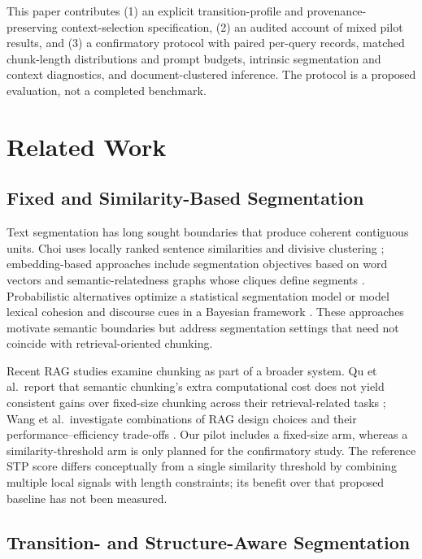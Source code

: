 \documentclass[10pt]{article}
\begin{document}
This paper contributes (1) an explicit transition-profile and provenance-preserving context-selection specification, (2) an audited account of mixed pilot results, and (3) a confirmatory protocol with paired per-query records, matched chunk-length distributions and prompt budgets, intrinsic segmentation and context diagnostics, and document-clustered inference. The protocol is a proposed evaluation, not a completed benchmark.

\section{Related Work}

\subsection{Fixed and Similarity-Based Segmentation}

Text segmentation has long sought boundaries that produce coherent contiguous units. Choi uses locally ranked sentence similarities and divisive clustering \cite{Choi2000AdvancesDomain}; embedding-based approaches include segmentation objectives based on word vectors \cite{Alemi2015TextSegmentation} and semantic-relatedness graphs whose cliques define segments \cite{Glavas2016UnsupervisedText}. Probabilistic alternatives optimize a statistical segmentation model \cite{Utiyama2001StatisticalModel} or model lexical cohesion and discourse cues in a Bayesian framework \cite{Eisenstein2008BayesianUnsupervised}. These approaches motivate semantic boundaries but address segmentation settings that need not coincide with retrieval-oriented chunking.

Recent RAG studies examine chunking as part of a broader system. Qu et al.\ report that semantic chunking's extra computational cost does not yield consistent gains over fixed-size chunking across their retrieval-related tasks \cite{Qu2024SemanticChunking}; Wang et al.\ investigate combinations of RAG design choices and their performance--efficiency trade-offs \cite{Wang2024SearchingBest}. Our pilot includes a fixed-size arm, whereas a similarity-threshold arm is only planned for the confirmatory study. The reference STP score differs conceptually from a single similarity threshold by combining multiple local signals with length constraints; its benefit over that proposed baseline has not been measured.

\subsection{Transition- and Structure-Aware Segmentation}
\end{document}
